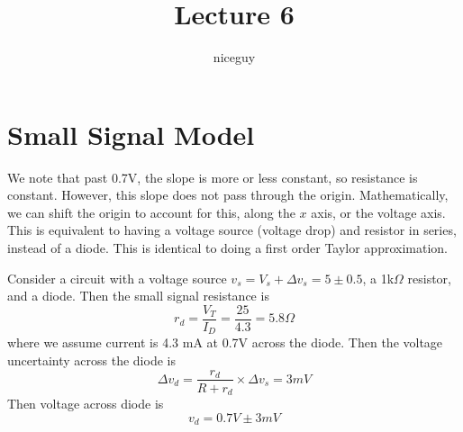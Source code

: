 \documentclass[12pt]{article}
\title{Lecture 6}
\author{niceguy}
\begin{document}
\maketitle

\section{Small Signal Model}

We note that past 0.7V, the slope is more or less constant, so resistance is constant. However, this slope does not pass through the origin. Mathematically, we can shift the origin to account for this, along the $x$ axis, or the voltage axis. This is equivalent to having a voltage source (voltage drop) and resistor in series, instead of a diode. This is identical to doing a first order Taylor approximation.

\begin{ex}
    Consider a circuit with a voltage source $v_s = V_s + \Delta v_s = 5 \pm 0.5$, a 1k$\Omega$ resistor, and a diode. Then the small signal resistance is
    $$r_d = \frac{V_T}{I_D} = \frac{25}{4.3} = 5.8\unit{\Omega}$$
    where we assume current is 4.3 mA at 0.7V across the diode. Then the voltage uncertainty across the diode is
    $$\Delta v_d = \frac{r_d}{R+r_d} \times \Delta v_s = 3\unit{mV}$$
    Then voltage across diode is
    $$v_d = 0.7 \unit{V} \pm 3 \unit{mV}$$
\end{ex}
\end{document}
